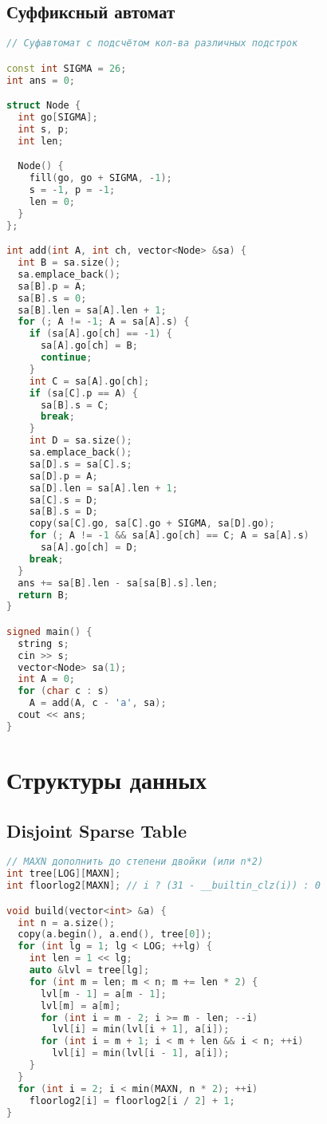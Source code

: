 \documentclass[9pt,a4paper,landscape,twosided]{extarticle}
\begin{document}
\begin{multicols*}{3}
\subsection{Суффиксный автомат}
\begin{lstlisting}[language=C++]
// Суфавтомат с подсчётом кол-ва различных подстрок

const int SIGMA = 26;
int ans = 0;

struct Node {
  int go[SIGMA];
  int s, p;
  int len;

  Node() {
    fill(go, go + SIGMA, -1);
    s = -1, p = -1;
    len = 0;
  }
};

int add(int A, int ch, vector<Node> &sa) {
  int B = sa.size();
  sa.emplace_back();
  sa[B].p = A;
  sa[B].s = 0;
  sa[B].len = sa[A].len + 1;
  for (; A != -1; A = sa[A].s) {
    if (sa[A].go[ch] == -1) {
      sa[A].go[ch] = B;
      continue;
    }
    int C = sa[A].go[ch];
    if (sa[C].p == A) {
      sa[B].s = C;
      break;
    }
    int D = sa.size();
    sa.emplace_back();
    sa[D].s = sa[C].s;
    sa[D].p = A;
    sa[D].len = sa[A].len + 1;
    sa[C].s = D;
    sa[B].s = D;
    copy(sa[C].go, sa[C].go + SIGMA, sa[D].go);
    for (; A != -1 && sa[A].go[ch] == C; A = sa[A].s)
      sa[A].go[ch] = D;
    break;
  }
  ans += sa[B].len - sa[sa[B].s].len;
  return B;
}

signed main() {
  string s;
  cin >> s;
  vector<Node> sa(1);
  int A = 0;
  for (char c : s)
    A = add(A, c - 'a', sa);
  cout << ans;
}
\end{lstlisting}

\section{Структуры данных}

\subsection{Disjoint Sparse Table}
\begin{lstlisting}[language=C++]
// MAXN дополнить до степени двойки (или n*2)
int tree[LOG][MAXN];
int floorlog2[MAXN]; // i ? (31 - __builtin_clz(i)) : 0

void build(vector<int> &a) {
  int n = a.size();
  copy(a.begin(), a.end(), tree[0]);
  for (int lg = 1; lg < LOG; ++lg) {
    int len = 1 << lg;
    auto &lvl = tree[lg];
    for (int m = len; m < n; m += len * 2) {
      lvl[m - 1] = a[m - 1];
      lvl[m] = a[m];
      for (int i = m - 2; i >= m - len; --i)
        lvl[i] = min(lvl[i + 1], a[i]);
      for (int i = m + 1; i < m + len && i < n; ++i)
        lvl[i] = min(lvl[i - 1], a[i]);
    }
  }
  for (int i = 2; i < min(MAXN, n * 2); ++i)
    floorlog2[i] = floorlog2[i / 2] + 1;
}


\end{lstlisting}
\end{multicols*}
\end{document}
